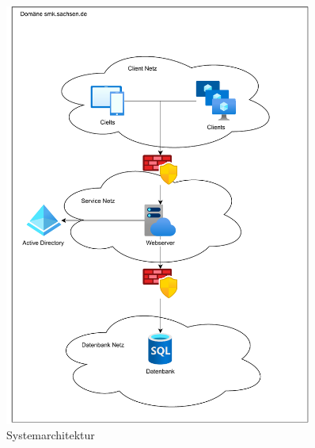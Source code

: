 \begin{figure}[htb]
    \centering
    \includegraphics[width=0.9\textwidth,angle=0]{anhang/abb/Systemarchitektur.pdf}
    \caption[Beschreibung]{Systemarchitektur}
    \label{abb:Systemarchitektur}
\end{figure}